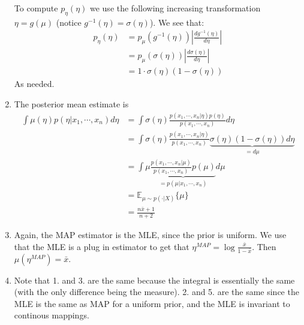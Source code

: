 \documentclass[paper=a4, fontsize=11pt]{scrartcl} %
\numberwithin{equation}{section} %
\numberwithin{figure}{section} %
\numberwithin{table}{section} %
\begin{document}
\begin{enumerate}
	To compute $p_{\eta}(\eta)$ we use the following increasing transformation $\eta = g(\mu)$ (notice $g^{-1}(\eta) = \sigma(\eta)$). We see that:
	\begin{align*}
	p_{\eta}(\eta) &= p_{\mu}(g^{-1}(\eta))\left|\frac{dg^{-1}(\eta)}{d\eta}\right| \\
	&= p_{\mu}(\sigma(\eta))\left|\frac{d\sigma(\eta)}{d\eta}\right| \\
	&= 1 \cdot \sigma(\eta)(1-\sigma(\eta))
	\end{align*}
	As needed.
	\item The posterior mean estimate is
	\begin{align*}
	\int \mu(\eta)p(\eta| x_1, \cdots, x_n)d\eta &= \int \sigma(\eta)\frac{p( x_1, \cdots, x_n | \eta)p(\eta)}{p(x_1, \cdots, x_n)}d\eta \\
	&= \int \sigma(\eta)\frac{p( x_1, \cdots, x_n | \eta)}{p( x_1, \cdots, x_n)} \underbrace{\sigma(\eta)(1-\sigma(\eta)) d\eta}_{=d\mu}\\
	&=\int \mu \underbrace{\frac{p( x_1, \cdots, x_n | \mu)}{p( x_1, \cdots, x_n)}p(\mu)}_{=p(\mu | x_1, \cdots, x_n)}d\mu \\
	&=\mathbb{E}_{\mu\sim p(\cdot | X)}\{\mu\} \\
	&=\frac{n \bar{x}+1}{n + 2}
	\end{align*}
	
	\item Again, the MAP estimator is the MLE, since the prior is uniform. We use that the MLE is a plug in estimator to get that $\eta^{MAP} = \log \frac{\bar{x}}{1-\bar{x}}$. Then $\mu(\eta^{MAP})= \bar{x}$.
	
	\item Note that 1. and 3. are the same because the integral is essentially the same (with the only difference being the measure). 2. and 5. are the same since the MLE is the same as MAP for a uniform prior, and the MLE is invariant to continous mappings.
	
	
\end{enumerate}
\end{document}
